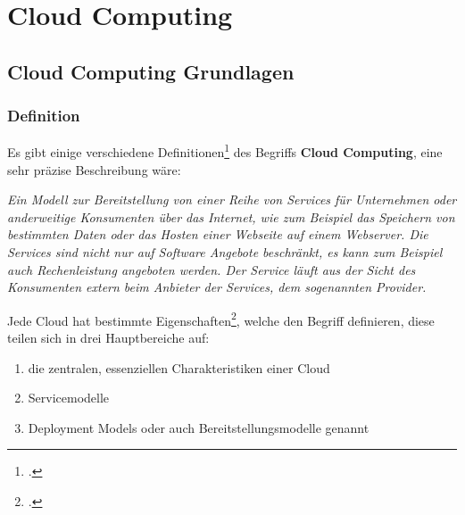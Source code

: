 \chapter{Cloud Computing}
\putz
\section{Cloud Computing Grundlagen}
\subsection{Definition}
Es gibt einige verschiedene Definitionen\footcite{Lehrunterlagen-HTL-cloud} des Begriffs \textbf{Cloud Computing}, eine sehr präzise Beschreibung wäre:

\begin{center}
   \textit{Ein Modell zur Bereitstellung von einer Reihe von Services für Unternehmen oder anderweitige Konsumenten über das Internet, wie zum Beispiel das
	Speichern von bestimmten Daten oder das Hosten einer Webseite auf einem Webserver. Die Services sind nicht nur auf Software Angebote beschränkt, es kann zum Beispiel auch Rechenleistung
	angeboten werden. Der Service läuft aus der Sicht des Konsumenten extern beim Anbieter der Services, dem sogenannten Provider.}
\end{center}

Jede Cloud hat bestimmte Eigenschaften\footcite{cloud-servicemodelle}, welche den Begriff definieren, diese teilen sich in drei Hauptbereiche auf:
\begin{enumerate}
	\item die zentralen, essenziellen Charakteristiken einer Cloud
	\item Servicemodelle
	\item Deployment Models oder auch Bereitstellungsmodelle genannt
\end{enumerate}

